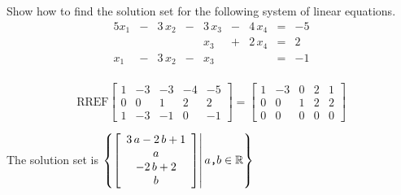 
\begin{exerciseStatement}


Show how to find the solution set for the following system of linear equations. 
\begin{alignat*}{5} x_{1} &-& 3 \, x_{2} &-& 3 \, x_{3} &-& 4 \, x_{4} &=& -5 \\ & &  & & x_{3} &+& 2 \, x_{4} &=& 2 \\x_{1} &-& 3 \, x_{2} &-& x_{3} & &  &=& -1 \\ \end{alignat*}
            


\end{exerciseStatement}
    
\begin{exerciseAnswer} 
\[\mathrm{RREF} \left[\begin{array}{cccc|c}
1 & -3 & -3 & -4 & -5 \\
0 & 0 & 1 & 2 & 2 \\
1 & -3 & -1 & 0 & -1
\end{array}\right]  =  \left[\begin{array}{cccc|c}
1 & -3 & 0 & 2 & 1 \\
0 & 0 & 1 & 2 & 2 \\
0 & 0 & 0 & 0 & 0
\end{array}\right] \]

The solution set is \( \left\{ \left[\begin{array}{c}
3 \, a - 2 \, b + 1 \\
a \\
-2 \, b + 2 \\
b
\end{array}\right] \middle|\,a\text{\texttt{,}}b\in\mathbb{R}\right\} \)


\end{exerciseAnswer}
    
